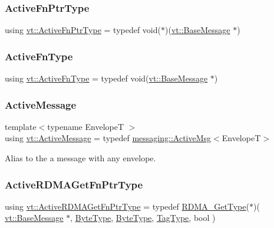 \subsubsection{\texorpdfstring{Active\+Fn\+Ptr\+Type}{ActiveFnPtrType}}
{\footnotesize\ttfamily using \hyperlink{namespacevt_a70e19bd64d031e65083c2125b2c65426}{vt\+::\+Active\+Fn\+Ptr\+Type} = typedef void($\ast$)(\hyperlink{namespacevt_ac34f95a5e2b8109b55bfba52b074443d}{vt\+::\+Base\+Message} $\ast$)}

\mbox{\label{namespacevt_a546925d221208866b866b2edf8f24d04}} 
\subsubsection{\texorpdfstring{Active\+Fn\+Type}{ActiveFnType}}
{\footnotesize\ttfamily using \hyperlink{namespacevt_a546925d221208866b866b2edf8f24d04}{vt\+::\+Active\+Fn\+Type} = typedef void(\hyperlink{namespacevt_ac34f95a5e2b8109b55bfba52b074443d}{vt\+::\+Base\+Message} $\ast$)}

\mbox{\label{namespacevt_a00eb67bd138395b6a4f744fab3fa0678}} 
\subsubsection{\texorpdfstring{Active\+Message}{ActiveMessage}}
{\footnotesize\ttfamily template$<$typename EnvelopeT $>$ \\
using \hyperlink{namespacevt_a00eb67bd138395b6a4f744fab3fa0678}{vt\+::\+Active\+Message} = typedef \hyperlink{structvt_1_1messaging_1_1_active_msg}{messaging\+::\+Active\+Msg}$<$EnvelopeT$>$}



Alias to the a message with any envelope. 

\mbox{\label{namespacevt_ae4fbf97da623bfcd09ee8379de756257}} 
\subsubsection{\texorpdfstring{Active\+R\+D\+M\+A\+Get\+Fn\+Ptr\+Type}{ActiveRDMAGetFnPtrType}}
{\footnotesize\ttfamily using \hyperlink{namespacevt_ae4fbf97da623bfcd09ee8379de756257}{vt\+::\+Active\+R\+D\+M\+A\+Get\+Fn\+Ptr\+Type} = typedef \hyperlink{namespacevt_a1cab7f4860f65a49ad2c042d6240f288}{R\+D\+M\+A\+\_\+\+Get\+Type}($\ast$)( \hyperlink{namespacevt_ac34f95a5e2b8109b55bfba52b074443d}{vt\+::\+Base\+Message} $\ast$, \hyperlink{namespacevt_aab8d55968084610ce3b17057981e9300}{Byte\+Type}, \hyperlink{namespacevt_aab8d55968084610ce3b17057981e9300}{Byte\+Type}, \hyperlink{namespacevt_a84ab281dae04a52a4b243d6bf62d0e52}{Tag\+Type}, bool )}

